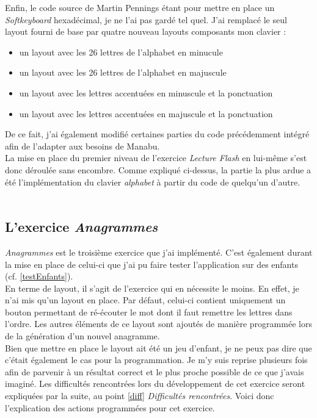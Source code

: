 Enfin, le code source de Martin Pennings étant pour mettre en place un \textit{Softkeyboard} hexadécimal, je ne l'ai pas gardé tel quel. J'ai remplacé le seul layout fourni de base par quatre nouveau layouts composants mon clavier :
\begin{itemize}
\item un layout avec les 26 lettres de l'alphabet en minucule
\item un layout avec les 26 lettres de l'alphabet en majuscule
\item un layout avec les lettres accentuées en minuscule et la ponctuation
\item un layout avec les lettres accentuées en majuscule et la ponctuation
\end{itemize}
De ce fait, j'ai également modifié certaines parties du code précédemment intégré afin de l'adapter aux besoins de Manabu.\\

La mise en place du premier niveau de l'exercice \textit{Lecture Flash} en lui-même s'est donc déroulée sans encombre. Comme expliqué ci-dessus, la partie la plus ardue a été l'implémentation du clavier \textit{alphabet} à partir du code de quelqu'un d'autre.\\\\
	
\subsection{L'exercice \textit{Anagrammes}}
\textit{Anagrammes} est le troisième exercice que j'ai implémenté. C'est également durant la mise en place de celui-ci que j'ai pu faire tester l'application sur des enfants (cf. \ref{testEnfants}).\\

En terme de layout, il s'agit de l'exercice qui en nécessite le moins. En effet, je n'ai mis qu'un layout en place. Par défaut, celui-ci contient uniquement un bouton permettant de ré-écouter le mot dont il faut remettre les lettres dans l'ordre. Les autres éléments de ce layout sont ajoutés de manière programmée lors de la génération d'un nouvel anagramme.\\

Bien que mettre en place le layout ait été un jeu d'enfant, je ne peux pas dire que c'était également le cas pour la programmation. Je m'y suis reprise plusieurs fois afin de parvenir à un résultat correct et le plus proche possible de ce que j'avais imaginé. Les difficultés rencontrées lors du développement de cet exercice seront expliquées par la suite, au point \ref{diff} \textit{Difficultés rencontrées}. Voici donc l'explication des actions programmées pour cet exercice.\\

